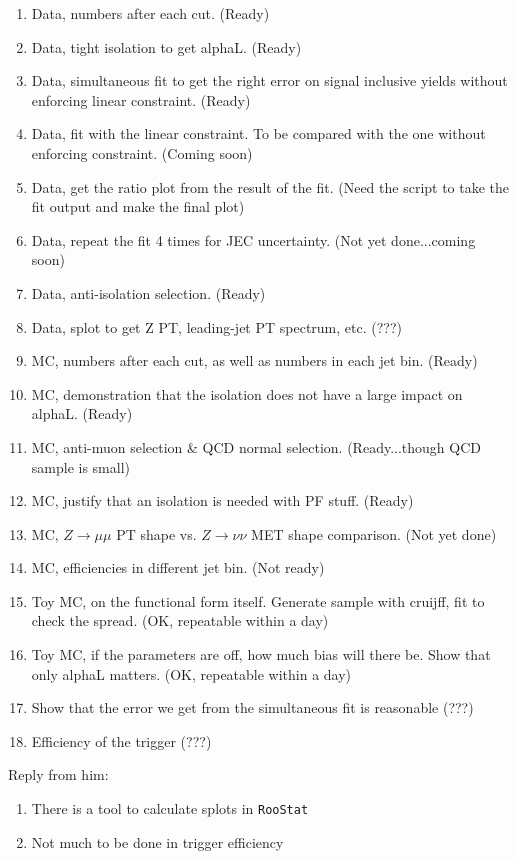 \begin{enumerate}
\item Data, numbers after each cut.  (Ready)
\item Data, tight isolation to get alphaL.  (Ready)
\item Data, simultaneous fit to get the right error on signal inclusive
yields without enforcing linear constraint.  (Ready)
\item Data, fit with the linear constraint.  To be compared with the one
without enforcing constraint.  (Coming soon)
\item Data, get the ratio plot from the result of the fit.  (Need the
script to take the fit output and make the final plot)
\item Data, repeat the fit 4 times for JEC uncertainty.  (Not yet
done...coming soon)
\item Data, anti-isolation selection.  (Ready)
\item Data, splot to get Z PT, leading-jet PT spectrum, etc. (???)
\item MC, numbers after each cut, as well as numbers in each jet bin.  (Ready)
\item MC, demonstration that the isolation does not have a large impact on
alphaL.  (Ready)
\item MC, anti-muon selection \& QCD normal selection.  (Ready...though QCD
sample is small)
\item MC, justify that an isolation is needed with PF stuff.  (Ready)
\item MC, $Z \rightarrow \mu\mu$ PT shape vs. $Z \rightarrow \nu\nu$ MET shape comparison.  (Not yet done)
\item MC, efficiencies in different jet bin.  (Not ready)
\item Toy MC, on the functional form itself.  Generate sample with
cruijff, fit to check the spread.  (OK, repeatable within a day)
\item Toy MC, if the parameters are off, how much bias will there be.
Show that only alphaL matters.  (OK, repeatable within a day)
\item Show that the error we get from the simultaneous fit is reasonable (???)
\item Efficiency of the trigger (???)
\end{enumerate}

Reply from him:

\begin{enumerate}
\item There is a tool to calculate splots in \texttt{RooStat}
\item Not much to be done in trigger efficiency
\end{enumerate}

